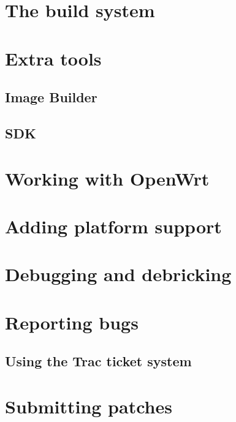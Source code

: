 \documentclass[a4paper]{book}
\begin{document}
  \section{The build system}
    
  \section{Extra tools}
    \subsection{Image Builder}
    \subsection{SDK}
  \section{Working with OpenWrt}
    
  \section{Adding platform support}
     
  \section{Debugging and debricking}
     
   \section{Reporting bugs}
	\subsection{Using the Trac ticket system}
	
   \section{Submitting patches}
    
\end{document}
